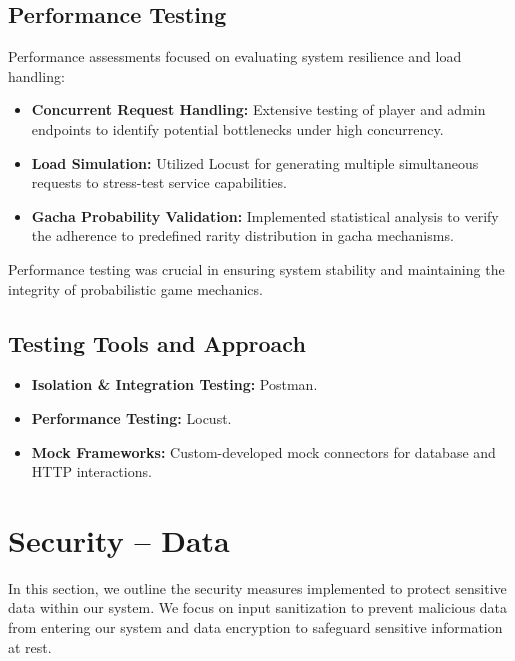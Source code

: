 \documentclass{article}
\begin{document}
\subsection{Performance Testing}
Performance assessments focused on evaluating system resilience and load handling:
\begin{itemize}
    \item \textbf{Concurrent Request Handling:} Extensive testing of player and admin endpoints to identify potential bottlenecks under high concurrency.
    \item \textbf{Load Simulation:} Utilized Locust for generating multiple simultaneous requests to stress-test service capabilities.
    \item \textbf{Gacha Probability Validation:} Implemented statistical analysis to verify the adherence to predefined rarity distribution in gacha mechanisms.
\end{itemize}
Performance testing was crucial in ensuring system stability and maintaining the integrity of probabilistic game mechanics.

\subsection{Testing Tools and Approach}
\begin{itemize}
    \item \textbf{Isolation \& Integration Testing:} Postman.
    \item \textbf{Performance Testing:} Locust.
    \item \textbf{Mock Frameworks:} Custom-developed mock connectors for database and HTTP interactions.
\end{itemize}
\newpage

\section{Security – Data}
In this section, we outline the security measures implemented to protect sensitive data within our system. We focus on input sanitization to prevent malicious data from entering our system and data encryption to safeguard sensitive information at rest.
\end{document}
